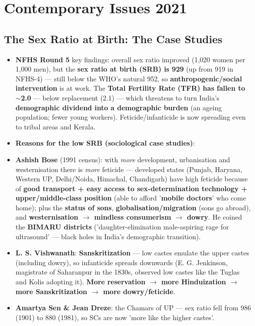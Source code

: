 \chapter{Contemporary Issues 2021}

\section{The Sex Ratio at Birth: The Case Studies}

\begin{KeyConcept}
\begin{itemize}
\item \textbf{NFHS Round 5} key findings: overall sex ratio improved (1,020 women per 1,000 men), but the \textbf{sex ratio at birth (SRB) is 929} (up from 919 in NFHS-4) --- still below the WHO's natural 952, so \textbf{anthropogenic/social intervention} is at work. The \textbf{Total Fertility Rate (TFR) has fallen to $\sim$2.0} --- below replacement (2.1) --- which threatens to turn India's \textbf{demographic dividend into a demographic burden} (an ageing population; fewer young workers). Feticide/infanticide is now spreading even to tribal areas and Kerala.
\item \textbf{Reasons for the low SRB (sociological case studies)}:
\item \textbf{Ashish Bose} (1991 census): with \emph{more} development, urbanisation and westernisation there is \emph{more} feticide --- developed states (Punjab, Haryana, Western UP, Delhi/Noida, Himachal, Chandigarh) have high feticide because of \textbf{good transport + easy access to sex-determination technology + upper/middle-class position} (able to afford '\textbf{mobile doctors}' who come home); plus the \textbf{status of sons}, \textbf{globalisation/migration} (sons go abroad), and \textbf{westernisation $\rightarrow$ mindless consumerism $\rightarrow$ dowry}. He coined the \textbf{BIMARU districts} ('daughter-elimination male-aspiring rage for ultrasound' --- black holes in India's demographic transition).
\item \textbf{L. S. Vishwanath}: \textbf{Sanskritization} --- low castes emulate the upper castes (including dowry), so infanticide spreads downwards (E. G. Jenkinson, magistrate of Saharanpur in the 1830s, observed low castes like the Tuglas and Kolis adopting it). \textbf{More reservation $\rightarrow$ more Hinduization $\rightarrow$ more Sanskritization $\rightarrow$ more dowry/feticide}.
\item \textbf{Amartya Sen \& Jean Dreze}: the Chamars of UP --- sex ratio fell from 986 (1901) to 880 (1981), so SCs are now 'more like the higher castes'.

\end{itemize}
\end{KeyConcept}
